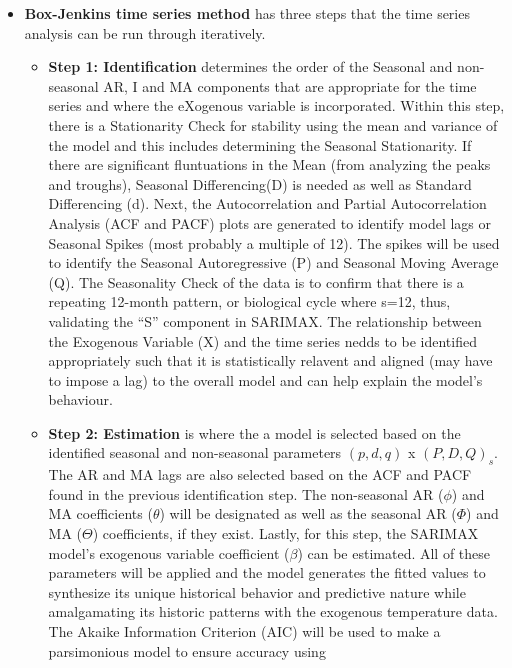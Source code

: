 \documentclass[
  letterpaper,
  DIV=11,
  numbers=noendperiod]{scrartcl}
\begin{document}
\begin{itemize}
\item
  \textbf{Box-Jenkins time series method} has three steps that the time
  series analysis can be run through iteratively.

  \begin{itemize}
  \item
    \textbf{Step 1: Identification} determines the order of the Seasonal
    and non-seasonal AR, I and MA components that are appropriate for
    the time series and where the eXogenous variable is incorporated.
    Within this step, there is a Stationarity Check for stability using
    the mean and variance of the model and this includes determining the
    Seasonal Stationarity. If there are significant fluntuations in the
    Mean (from analyzing the peaks and troughs), Seasonal
    Differencing(D) is needed as well as Standard Differencing (d).
    Next, the Autocorrelation and Partial Autocorrelation Analysis (ACF
    and PACF) plots are generated to identify model lags or Seasonal
    Spikes (most probably a multiple of 12). The spikes will be used to
    identify the Seasonal Autoregressive (P) and Seasonal Moving Average
    (Q). The Seasonality Check of the data is to confirm that there is a
    repeating 12-month pattern, or biological cycle where s=12, thus,
    validating the ``S'' component in SARIMAX. The relationship between
    the Exogenous Variable (X) and the time series nedds to be
    identified appropriately such that it is statistically relavent and
    aligned (may have to impose a lag) to the overall model and can help
    explain the model's behaviour.
  \item
    \textbf{Step 2: Estimation} is where the a model is selected based
    on the identified seasonal and non-seasonal parameters \((p, d, q)\)
    x \((P,D,Q)_s\). The AR and MA lags are also selected based on the
    ACF and PACF found in the previous identification step. The
    non-seasonal AR (\(\phi\)) and MA coefficients (\(\theta\)) will be
    designated as well as the seasonal AR (\(\Phi\)) and MA (\(\Theta\))
    coefficients, if they exist. Lastly, for this step, the SARIMAX
    model's exogenous variable coefficient (\(\beta\)) can be estimated.
    All of these parameters will be applied and the model generates the
    fitted values to synthesize its unique historical behavior and
    predictive nature while amalgamating its historic patterns with the
    exogenous temperature data. The Akaike Information Criterion (AIC)
    will be used to make a parsimonious model to ensure accuracy using

\end{itemize}
\end{itemize}
\end{document}
